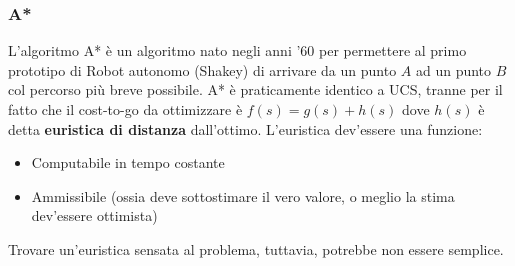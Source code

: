 \subsubsection{A*}
L'algoritmo A* è un algoritmo nato negli anni '60 per permettere al primo prototipo di Robot autonomo (Shakey) di arrivare da un punto
$A$ ad un punto $B$ col percorso più breve possibile. A* è praticamente identico a UCS, tranne per il fatto che il cost-to-go da ottimizzare è 
$f(s) = g(s) + h(s) $ dove $h(s)$ è detta \textbf{euristica di distanza} dall'ottimo. 
L'euristica dev'essere una funzione:
\begin{itemize}
    \item Computabile in tempo costante
    \item Ammissibile (ossia deve sottostimare il vero valore, o meglio la stima dev'essere ottimista)
\end{itemize} 
Trovare un'euristica sensata al problema, tuttavia, potrebbe non essere semplice.


